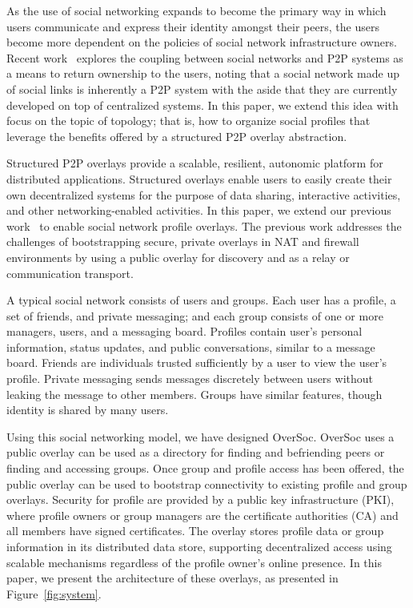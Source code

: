 \documentclass{sig-alternate}
\begin{document}
As the use of social networking expands to become the primary way in which
users communicate and express their identity amongst their peers, the users
become more dependent on the policies of social network infrastructure owners.
Recent work~\cite{p2p_socialnetwork} explores the coupling between social
networks and P2P systems as a means to return ownership to the users, noting
that a social network made up of social links is inherently a P2P system with
the aside that they are currently developed on top of centralized systems.  In
this paper, we extend this idea with focus on the topic of topology; that is,
how to organize social profiles that leverage the benefits offered by a
structured P2P overlay abstraction.

Structured P2P overlays provide a scalable, resilient, autonomic platform for
distributed applications.  Structured overlays enable users to easily create
their own decentralized systems for the purpose of data sharing, interactive
activities, and other networking-enabled activities.  In this paper, we extend
our previous work~\cite{vpo} to enable social network profile overlays.  The
previous work addresses the challenges of bootstrapping secure, private
overlays in NAT and firewall environments by using a public overlay for
discovery and as a relay or communication transport.  

A typical social network consists of users and groups.  Each user has a
profile, a set of friends, and private messaging; and each group consists of
one or more managers, users, and a messaging board.  Profiles contain user's
personal information, status updates, and public conversations, similar to a
message board.  Friends are individuals trusted sufficiently by a user to view
the user's profile.  Private messaging sends messages discretely between users
without leaking the message to other members.  Groups have similar features,
though identity is shared by many users.

Using this social networking model, we have designed OverSoc.  OverSoc uses a
public overlay can be used as a directory for finding and befriending peers or
finding and accessing groups.  Once group and profile access has been offered,
the public overlay can be used to bootstrap connectivity to existing profile
and group overlays.  Security for profile are provided by a public key
infrastructure (PKI), where profile owners or group managers are the
certificate authorities (CA) and all members have signed certificates.  The
overlay stores profile data or group information in its distributed data store,
supporting decentralized access using scalable mechanisms regardless of the
profile owner's online presence.  In this paper, we present the architecture of
these overlays, as presented in Figure~\ref{fig:system}.
\end{document}
